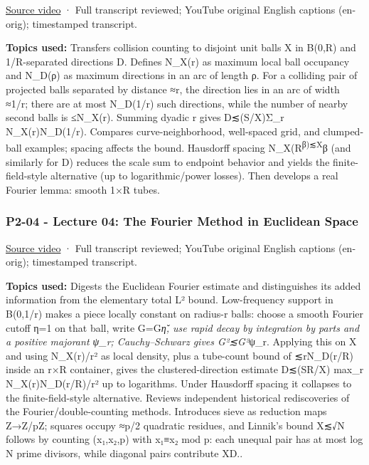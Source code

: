 \href{https://www.youtube.com/watch?v=OAI8C20E7R4}{Source video} · Full transcript reviewed; YouTube original English captions (en-orig); timestamped transcript.

\textbf{Topics used:} Transfers collision counting to disjoint unit balls X in B(0,R) and 1/R-separated directions D. Defines N\_X(r) as maximum local ball occupancy and N\_D(ρ) as maximum directions in an arc of length ρ. For a colliding pair of projected balls separated by distance ≈r, the direction lies in an arc of width ≈1/r; there are at most N\_D(1/r) such directions, while the number of nearby second balls is ≤N\_X(r). Summing dyadic r gives \textbar D\textbar≲(S/\textbar X\textbar)Σ\_r N\_X(r)N\_D(1/r). Compares curve-neighborhood, well-spaced grid, and clumped-ball examples; spacing affects the bound. Hausdorff spacing N\_X(R\textsuperscript{β)≲\textbar X\textbar{}}β (and similarly for D) reduces the scale sum to endpoint behavior and yields the finite-field-style alternative (up to logarithmic/power losses). Then develops a real Fourier lemma: smooth 1×R tubes.

\subsubsection{P2-04 - Lecture 04: The Fourier Method in Euclidean Space}\label{04-visual-computing-ii-ch036-p2-04---lecture-04-the-fourier-method-in-euclidean-space}

\href{https://www.youtube.com/watch?v=X-4how4KkPQ}{Source video} · Full transcript reviewed; YouTube original English captions (en-orig); timestamped transcript.

\textbf{Topics used:} Digests the Euclidean Fourier estimate and distinguishes its added information from the elementary total L² bound. Low-frequency support in B(0,1/r) makes a piece locally constant on radius-r balls: choose a smooth Fourier cutoff η=1 on that ball, write G=G\emph{η̌, use rapid decay by integration by parts and a positive majorant ψ\_r; Cauchy--Schwarz gives \textbar G\textbar²≲\textbar G\textbar²}ψ\_r. Applying this on X and using N\_X(r)/r² as local density, plus a tube-count bound of ≲rN\_D(r/R) inside an r×R container, gives the clustered-direction estimate \textbar D\textbar≲(SR/\textbar X\textbar) max\_r N\_X(r)N\_D(r/R)/r² up to logarithms. Under Hausdorff spacing it collapses to the finite-field-style alternative. Reviews independent historical rediscoveries of the Fourier/double-counting methods. Introduces sieve as reduction maps Z→Z/pZ; squares occupy ≈p/2 quadratic residues, and Linnik's bound \textbar X\textbar≲√N follows by counting (x₁,x₂,p) with x₁≡x₂ mod p: each unequal pair has at most log N prime divisors, while diagonal pairs contribute \textbar X\textbar\textbar D\textbar..

